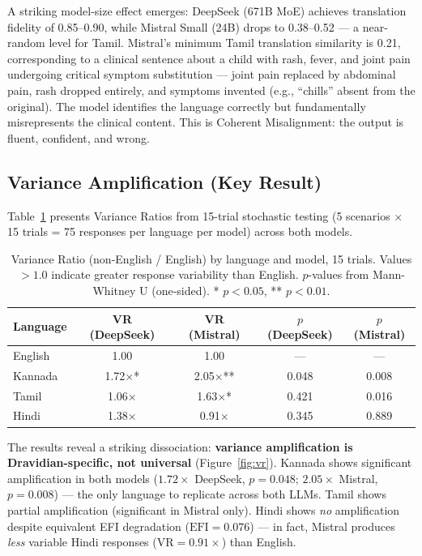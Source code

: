 \documentclass[11pt,a4paper]{article}
\begin{document}
A striking model-size effect emerges: DeepSeek (671B MoE) achieves translation fidelity of 0.85--0.90, while Mistral Small (24B) drops to 0.38--0.52 --- a near-random level for Tamil. Mistral's minimum Tamil translation similarity is 0.21, corresponding to a clinical sentence about a child with rash, fever, and joint pain undergoing critical symptom substitution --- joint pain replaced by abdominal pain, rash dropped entirely, and symptoms invented (e.g., ``chills'' absent from the original). The model identifies the language correctly but fundamentally misrepresents the clinical content. This is Coherent Misalignment: the output is fluent, confident, and wrong.

\subsection{Variance Amplification (Key Result)}

Table~\ref{tab:vr} presents Variance Ratios from 15-trial stochastic testing (5 scenarios $\times$ 15 trials = 75 responses per language per model) across both models.

\begin{table}[H]
\centering
\caption{Variance Ratio (non-English / English) by language and model, 15 trials. Values $> 1.0$ indicate greater response variability than English. $p$-values from Mann-Whitney U (one-sided). * $p < 0.05$, ** $p < 0.01$.}
\label{tab:vr}
\begin{tabular}{lcccc}
\toprule
\textbf{Language} & \textbf{VR (DeepSeek)} & \textbf{VR (Mistral)} & \textbf{$p$ (DeepSeek)} & \textbf{$p$ (Mistral)} \\
\midrule
English  & 1.00 & 1.00 & --- & --- \\
Kannada  & 1.72$\times$* & 2.05$\times$** & 0.048 & 0.008 \\
Tamil    & 1.06$\times$ & 1.63$\times$* & 0.421 & 0.016 \\
Hindi    & 1.38$\times$ & 0.91$\times$ & 0.345 & 0.889 \\
\bottomrule
\end{tabular}
\end{table}

The results reveal a striking dissociation: \textbf{variance amplification is Dravidian-specific, not universal} (Figure~\ref{fig:vr}). Kannada shows significant amplification in both models ($1.72\times$ DeepSeek, $p = 0.048$; $2.05\times$ Mistral, $p = 0.008$) --- the only language to replicate across both LLMs. Tamil shows partial amplification (significant in Mistral only). Hindi shows \emph{no} amplification despite equivalent EFI degradation ($\text{EFI} = 0.076$) --- in fact, Mistral produces \emph{less} variable Hindi responses ($\text{VR} = 0.91\times$) than English.
\end{document}
